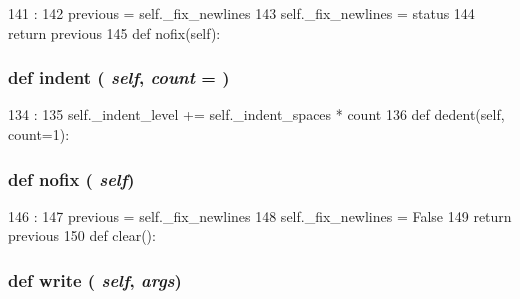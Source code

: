 \begin{DoxyCode}
141                          :
142         previous = self._fix_newlines
143         self._fix_newlines = status
144         return previous
145 
    def nofix(self):
\end{DoxyCode}
\hypertarget{classm5_1_1util_1_1code__formatter_1_1code__formatter_a06fdea5005bd6d0c00b1b12679fbb258}{
\subsubsection[{indent}]{\setlength{\rightskip}{0pt plus 5cm}def indent ( {\em self}, \/   {\em count} = {})}}
\label{classm5_1_1util_1_1code__formatter_1_1code__formatter_a06fdea5005bd6d0c00b1b12679fbb258}



\begin{DoxyCode}
134                              :
135         self._indent_level += self._indent_spaces * count
136 
    def dedent(self, count=1):
\end{DoxyCode}
\hypertarget{classm5_1_1util_1_1code__formatter_1_1code__formatter_a3fd79eb94d7f3fd257c0ce5593dbf1e1}{
\subsubsection[{nofix}]{\setlength{\rightskip}{0pt plus 5cm}def nofix ( {\em self})}}
\label{classm5_1_1util_1_1code__formatter_1_1code__formatter_a3fd79eb94d7f3fd257c0ce5593dbf1e1}



\begin{DoxyCode}
146                    :
147         previous = self._fix_newlines
148         self._fix_newlines = False
149         return previous
150 
    def clear():
\end{DoxyCode}
\hypertarget{classm5_1_1util_1_1code__formatter_1_1code__formatter_a8c7fc40f1124fcf3f5ee7116cd62f413}{
\subsubsection[{write}]{\setlength{\rightskip}{0pt plus 5cm}def write ( {\em self}, \/   {\em args})}}
\label{classm5_1_1util_1_1code__formatter_1_1code__formatter_a8c7fc40f1124fcf3f5ee7116cd62f413}



